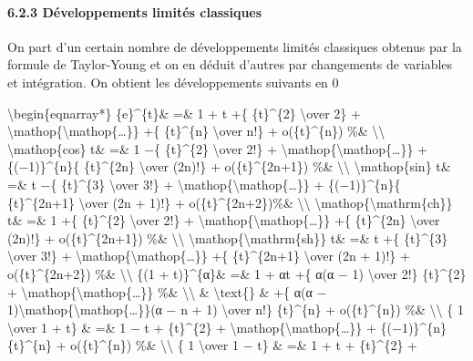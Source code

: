 \documentclass[]{article}
\begin{document}
\paragraph{6.2.3 Développements limités classiques}

On part d'un certain nombre de développements limités classiques obtenus
par la formule de Taylor-Young et on en déduit d'autres par changements
de variables et intégration. On obtient les développements suivants en 0

\textbackslash{}begin\{eqnarray*\} \{e\}\^{}\{t\}\& =\& 1 + t +\{
\{t\}\^{}\{2\} \textbackslash{}over 2\} +
\textbackslash{}mathop\{\textbackslash{}mathop\{\ldots{}\}\} +\{
\{t\}\^{}\{n\} \textbackslash{}over n!\} + o(\{t\}\^{}\{n\}) \%\&
\textbackslash{}\textbackslash{} \textbackslash{}mathop\{cos\} t\& =\& 1
−\{ \{t\}\^{}\{2\} \textbackslash{}over 2!\} +
\textbackslash{}mathop\{\textbackslash{}mathop\{\ldots{}\}\} +
\{(−1)\}\^{}\{n\}\{ \{t\}\^{}\{2n\} \textbackslash{}over (2n)!\} +
o(\{t\}\^{}\{2n+1\}) \%\& \textbackslash{}\textbackslash{}
\textbackslash{}mathop\{sin\} t\& =\& t −\{ \{t\}\^{}\{3\}
\textbackslash{}over 3!\} +
\textbackslash{}mathop\{\textbackslash{}mathop\{\ldots{}\}\} +
\{(−1)\}\^{}\{n\}\{ \{t\}\^{}\{2n+1\} \textbackslash{}over (2n + 1)!\} +
o(\{t\}\^{}\{2n+2\})\%\& \textbackslash{}\textbackslash{}
\textbackslash{}mathop\{\textbackslash{}mathrm\{ch\}\} t\& =\& 1 +\{
\{t\}\^{}\{2\} \textbackslash{}over 2!\} +
\textbackslash{}mathop\{\textbackslash{}mathop\{\ldots{}\}\} +\{
\{t\}\^{}\{2n\} \textbackslash{}over (2n)!\} + o(\{t\}\^{}\{2n+1\}) \%\&
\textbackslash{}\textbackslash{}
\textbackslash{}mathop\{\textbackslash{}mathrm\{sh\}\} t\& =\& t +\{
\{t\}\^{}\{3\} \textbackslash{}over 3!\} +
\textbackslash{}mathop\{\textbackslash{}mathop\{\ldots{}\}\} +\{
\{t\}\^{}\{2n+1\} \textbackslash{}over (2n + 1)!\} +
o(\{t\}\^{}\{2n+2\}) \%\& \textbackslash{}\textbackslash{} \{(1 +
t)\}\^{}\{α\}\& =\& 1 + αt +\{ α(α − 1) \textbackslash{}over 2!\}
\{t\}\^{}\{2\} +
\textbackslash{}mathop\{\textbackslash{}mathop\{\ldots{}\}\} \%\&
\textbackslash{}\textbackslash{} \& \textbackslash{}text\{\} \& +\{ α(α
− 1)\textbackslash{}mathop\{\textbackslash{}mathop\{\ldots{}\}\}(α − n +
1) \textbackslash{}over n!\} \{t\}\^{}\{n\} + o(\{t\}\^{}\{n\}) \%\&
\textbackslash{}\textbackslash{} \{ 1 \textbackslash{}over 1 + t\} \&
=\& 1 − t + \{t\}\^{}\{2\} +
\textbackslash{}mathop\{\textbackslash{}mathop\{\ldots{}\}\} +
\{(−1)\}\^{}\{n\}\{t\}\^{}\{n\} + o(\{t\}\^{}\{n\}) \%\&
\textbackslash{}\textbackslash{} \{ 1 \textbackslash{}over 1 − t\} \&
=\& 1 + t + \{t\}\^{}\{2\} +
\end{document}
